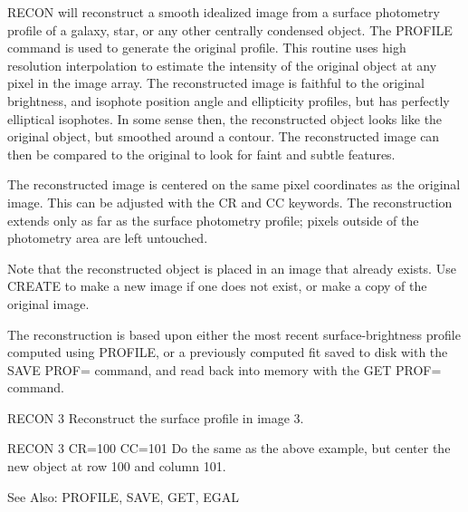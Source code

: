 RECON will reconstruct a smooth idealized image from a surface photometry
profile of a galaxy, star, or any other centrally condensed object. The
PROFILE command is used to generate the original profile.  This routine
uses high resolution interpolation to estimate the intensity of the
original object at any pixel in the image array.  The reconstructed image
is faithful to the original brightness, and isophote position angle and
ellipticity profiles, but has perfectly elliptical isophotes.  In some
sense then, the reconstructed object looks like the original object, but
smoothed around a contour.  The reconstructed image can then be compared to
the original to look for faint and subtle features.

The reconstructed image is centered on the same pixel coordinates as the
original image. This can be adjusted with the CR and CC keywords. The
reconstruction extends only as far as the surface photometry profile;
pixels outside of the photometry area are left untouched.

Note that the reconstructed object is placed in an image that already
exists.  Use CREATE to make a new image if one does not exist, or make a
copy of the original image.

The reconstruction is based upon either the most recent surface-brightness
profile computed using PROFILE, or a previously computed fit saved to disk
with the SAVE PROF= command, and read back into memory with the GET PROF=
command.

\begin{example}
  \item[RECON 3\hfill]{Reconstruct the surface profile in image 3.}

  \item[RECON 3 CR=100 CC=101\hfill]{Do the same as the above example,
       but center the new object at row 100 and column 101.}
\end{example}

See Also: PROFILE, SAVE, GET, EGAL


